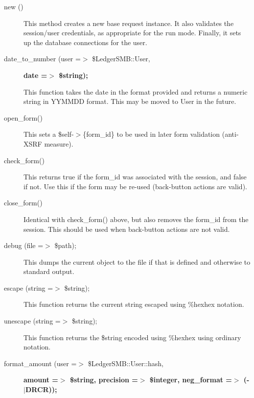 \begin{description}

\item[{new ()}] \mbox{}

This method creates a new base request instance. It also validates the 
session/user credentials, as appropriate for the run mode.  Finally, it sets up 
the database connections for the user.


\item[{date\_to\_number (user =$>$ \$LedgerSMB::User,}] \textbf{date =$>$ \$string);}

This function takes the date in the format provided and returns a numeric 
string in YYMMDD format.  This may be moved to User in the future.


\item[{open\_form()}] \mbox{}

This sets a \$self-$>$\{form\_id\} to be used in later form validation (anti-XSRF 
measure).


\item[{check\_form()}] \mbox{}

This returns true if the form\_id was associated with the session, and false if 
not.  Use this if the form may be re-used (back-button actions are valid).


\item[{close\_form()}] \mbox{}

Identical with check\_form() above, but also removes the form\_id from the 
session.  This should be used when back-button actions are not valid.


\item[{debug (file =$>$ \$path);}] \mbox{}

This dumps the current object to the file if that is defined and otherwise to 
standard output.


\item[{escape (string =$>$ \$string);}] \mbox{}

This function returns the current string escaped using \%hexhex notation.


\item[{unescape (string =$>$ \$string);}] \mbox{}

This function returns the \$string encoded using \%hexhex using ordinary notation.


\item[{format\_amount (user =$>$ \$LedgerSMB::User::hash,}] \textbf{amount =$>$ \$string, precision =$>$ \$integer, neg\_format =$>$ (-$|$DRCR));}


\end{description}
